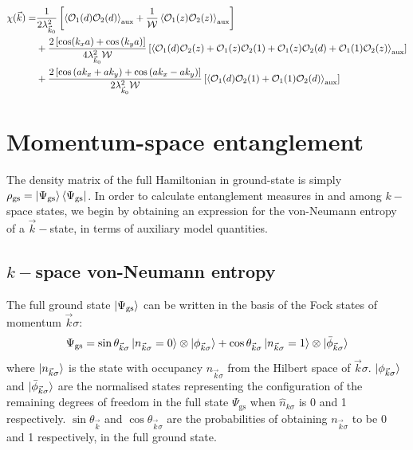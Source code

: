 \documentclass[prb]{revtex4-2}
\begin{document}
\begin{equation}\begin{aligned}
	\chi(\vec k)=& \frac{1}{2\lambda_{\vec k_0}^2}\left[\braket{\mathcal{O}_1(d) \mathcal{O}_2(d)}_\text{aux} + \frac{1}{\mathcal{W}}\braket{\mathcal{O}_1(z) \mathcal{O}_2(z)}_\text{aux}\right]\\
		    &+ \frac{2\left[\cos(k_x a) + \cos\left(k_y a\right)\right]}{4\lambda_{\vec k_0}^2 \mathcal{W}}\left[\braket{\mathcal{O}_1(d) \mathcal{O}_2(z) + \mathcal{O}_1(z) \mathcal{O}_2(1) + \mathcal{O}_1(z) \mathcal{O}_2(d) + \mathcal{O}_1(1) \mathcal{O}_2(z)}_\text{aux}\right] \\
		    &+ \frac{2\left[\cos \left(ak_x + ak_y\right) + \cos \left( ak_x - ak_y \right) \right]}{2\lambda_{\vec k_0}^2 \mathcal{W}}\left[\braket{\mathcal{O}_1(d) \mathcal{O}_2(1) + \mathcal{O}_1(1) \mathcal{O}_2(d)}_\text{aux}\right] 
\end{aligned}\end{equation}

\section{Momentum-space entanglement}
The density matrix of the full Hamiltonian in ground-state is simply \(\rho_\text{gs} = \ket{\Psi_\text{gs}}\bra{\Psi_\text{gs}}\). In order to calculate entanglement measures in and among \(k-\)space states, we begin by obtaining an expression for the von-Neumann entropy of a \(\vec k-\)state, in terms of auxiliary model quantities.

\subsection{\(k-\)space von-Neumann entropy}
The full ground state \(\ket{\Psi_\text{gs}}\) can be written in the basis of the Fock states of momentum \(\vec k\sigma\):
\begin{equation}\begin{aligned}
	\Psi_\text{gs} = \sin\theta_{\vec k\sigma} \ket{n_{\vec k\sigma} = 0}\otimes\ket{\phi_{\vec k\sigma}} + \cos\theta_{\vec k\sigma} \ket{n_{\vec k\sigma} = 1}\otimes\ket{\bar\phi_{\vec k\sigma}}
\end{aligned}\end{equation}
where \(\ket{n_{\vec k\sigma}}\) is the state with occupancy \(n_{\vec k\sigma}\) from the Hilbert space of \(\vec k\sigma\). \(\ket{\phi_{\vec k\sigma}}\) and \(\ket{\bar\phi_{\vec k\sigma}}\) are the normalised states representing the configuration of the remaining degrees of freedom in the full state \(\Psi_\text{gs}\) when \(\hat n_{k\sigma}\) is 0 and 1 respectively. \(\sin \theta_{\vec k}\) and \(\cos\theta_{\vec k\sigma}\) are the probabilities of obtaining \(n_{\vec k\sigma}\) to be 0 and 1 respectively, in the full ground state.
\end{document}
